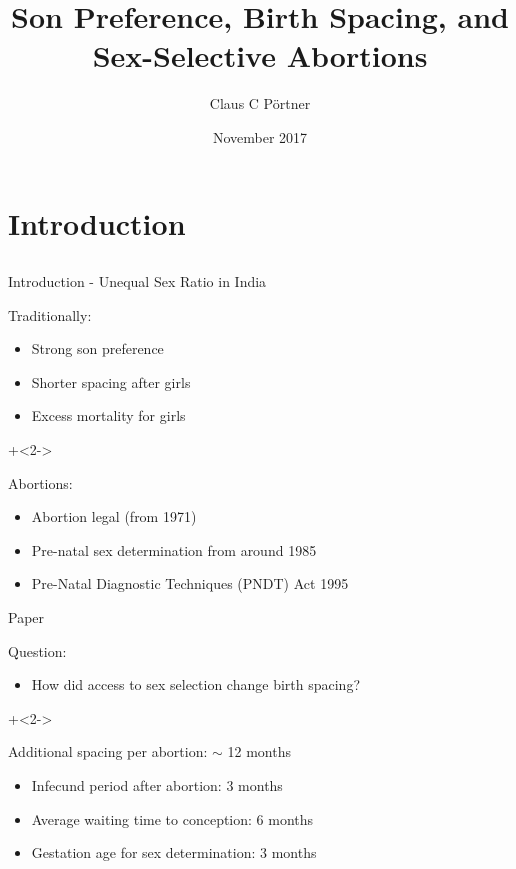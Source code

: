 \documentclass[red]{beamer}
\title[Son Preference and Birth Spacing]{Son Preference, Birth Spacing, and Sex-Selective Abortions}
\author{Claus C P\"ortner}
\date{November 2017}
\begin{document}
\graphicspath{{../figures/}}



\begin{frame}
    \titlepage
\end{frame}


\section{Introduction}
\subsection{}

\begin{frame}{Introduction - Unequal Sex Ratio in India}

Traditionally:
\begin{itemize}
 \item Strong son preference
 \item Shorter spacing after girls
 \item Excess mortality for girls
\end{itemize}

\onslide+<2->{
\bigskip

Abortions:
\begin{itemize}
 \item Abortion legal (from 1971)
 \item Pre-natal sex determination from around 1985
 \item Pre-Natal Diagnostic Techniques (PNDT) Act 1995
\end{itemize}
}

\end{frame}


\begin{frame}{Paper}

Question:
\begin{itemize}
\item How did access to sex selection change birth spacing?
\end{itemize}

\onslide+<2->{
\bigskip

Additional spacing per abortion: $\sim$ 12 months
\begin{itemize}
 \item Infecund period after abortion: 3 months
 \item Average waiting time to conception: 6 months
 \item Gestation age for sex determination: 3 months
\end{itemize}
}


\end{frame}
\end{document}

